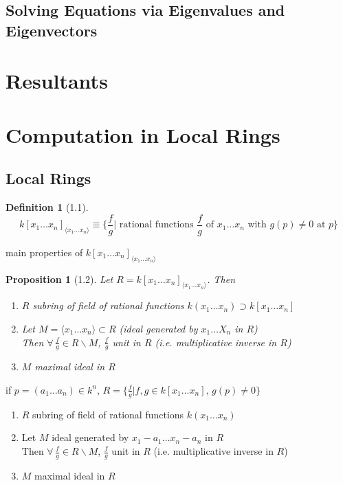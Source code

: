 \documentclass[10pt]{amsart}
\newtheorem{proposition}{Proposition}
\newtheorem{definition}{Definition}
\newcommand{\exercisehead}[1]
  { \smallskip
   \noindent{\small\bf Exercise #1.}
  }
\begin{document}
\begin{multicols*}{2}
\subsection{}

\subsection{Solving Equations via Eigenvalues and Eigenvectors}


\section{ Resultants }

\section{Computation in Local Rings}

\subsection{Local Rings}


\begin{definition}[1.1]
  \[
k[x_1 \dots x_n]_{\langle x_1 \dots x_n \rangle} \equiv \lbrace \frac{f}{g} | \text{ rational functions } \frac{f}{g} \text{ of } x_1 \dots x_n \text{ with } g(p) \neq 0 \text{ at } p \rbrace
\]
\end{definition}

main properties of $k[x_1 \dots x_n]_{\langle x_1 \dots x_n \rangle }$

\begin{proposition}[1.2]
  Let $R= k[x_1 \dots x_n]_{\langle x_1 \dots x_n \rangle }$.  Then
\begin{enumerate}
\item[(a)] $R$ subring of field of rational functions $k(x_1 \dots x_n) \supset k[x_1 \dots x_n]$
\item[(b)] Let $M=\langle x_1 \dots x_n \rangle \subset R$ (ideal generated by $x_1 \dots X_n$ in $R$) \\
Then $\forall \, \frac{f}{g} \in R \backslash M$, $\frac{f}{g}$ unit in $R$ (i.e. multiplicative inverse in $R$)
\item[(c)] $M$ maximal ideal in $R$
\end{enumerate}
\end{proposition}


\exercisehead{1} if $p=(a_1 \dots a_n) \in k^n$, $R = \lbrace \frac{f}{g} | f,g\in k[x_1 \dots x_n] , \, g(p) \neq 0 \rbrace$ 
\begin{enumerate}
\item[(a)] $R$ subring of field of rational functions $k(x_1 \dots x_n)$ 
\item[(b)] Let $M$ ideal generated by $x_1 - a_1 \dots x_n -a_n$ in $R$  \\
Then $\forall \, \frac{f}{g} \in R\backslash M$, $\frac{f}{g}$ unit in $R$ (i.e. multiplicative inverse in $R$)
\item[(c)]  $M$ maximal ideal in $R$
\end{enumerate}



\end{multicols*}
\end{document}
